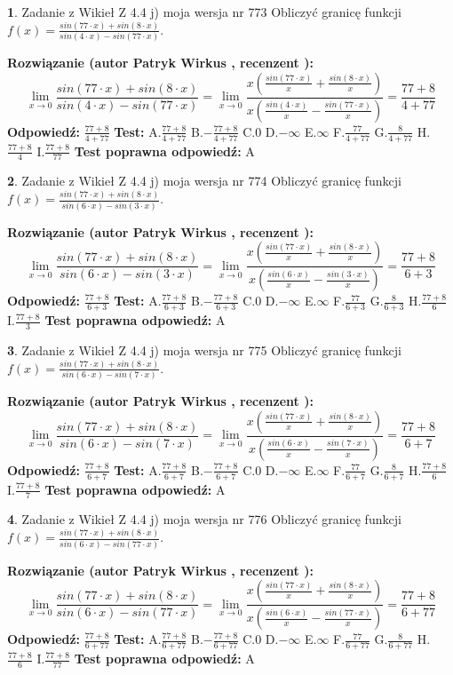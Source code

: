 \documentclass[12pt, a4paper]{article}
\theoremstyle{definition} %
\newtheorem{zad}{}
\newcommand{\zadStart}[1]{\begin{zad}#1\newline}
\newcommand{\zadStop}{\end{zad}}
\newcommand{\rozwStart}[2]{\noindent \textbf{Rozwiązanie (autor #1 , recenzent #2): }\newline}
\newcommand{\rozwStop}{\newline}
\newcommand{\odpStart}{\noindent \textbf{Odpowiedź:}\newline}
\newcommand{\odpStop}{\newline}
\newcommand{\testStart}{\noindent \textbf{Test:}\newline}
\newcommand{\testStop}{\newline}
\newcommand{\kluczStart}{\noindent \textbf{Test poprawna odpowiedź:}\newline}
\newcommand{\kluczStop}{\newline}
\begin{document}
\zadStart{Zadanie z Wikieł Z 4.4 j) moja wersja nr 773}
Obliczyć granicę funkcji $f(x)=\frac{sin(77\cdot x) +sin(8\cdot x)}{sin(4\cdot x) -sin(77\cdot x)}$.
\zadStop
\rozwStart{Patryk Wirkus}{}
$$\lim\limits_{x\to 0}\frac{sin(77\cdot x) +sin(8\cdot x)}{sin(4\cdot x) -sin(77\cdot x)}=\lim\limits_{x\to 0}\frac{x(\frac{sin(77\cdot x)}{x}+\frac{sin(8\cdot x)}{x})}{x(\frac{sin(4\cdot x)}{x}-\frac{sin(77\cdot x)}{x})}=\frac{77+8}{4+77}$$
\rozwStop
\odpStart
$\frac{77+8}{4+77}$
\odpStop
\testStart
A.$\frac{77+8}{4+77}$
B.$-\frac{77+8}{4+77}$
C.$0$
D.$-\infty$
E.$\infty$
F.$\frac{77}{4+77}$
G.$\frac{8}{4+77}$
H.$\frac{77+8}{4}$
I.$\frac{77+8}{77}$
\testStop
\kluczStart
A
\kluczStop



\zadStart{Zadanie z Wikieł Z 4.4 j) moja wersja nr 774}
Obliczyć granicę funkcji $f(x)=\frac{sin(77\cdot x) +sin(8\cdot x)}{sin(6\cdot x) -sin(3\cdot x)}$.
\zadStop
\rozwStart{Patryk Wirkus}{}
$$\lim\limits_{x\to 0}\frac{sin(77\cdot x) +sin(8\cdot x)}{sin(6\cdot x) -sin(3\cdot x)}=\lim\limits_{x\to 0}\frac{x(\frac{sin(77\cdot x)}{x}+\frac{sin(8\cdot x)}{x})}{x(\frac{sin(6\cdot x)}{x}-\frac{sin(3\cdot x)}{x})}=\frac{77+8}{6+3}$$
\rozwStop
\odpStart
$\frac{77+8}{6+3}$
\odpStop
\testStart
A.$\frac{77+8}{6+3}$
B.$-\frac{77+8}{6+3}$
C.$0$
D.$-\infty$
E.$\infty$
F.$\frac{77}{6+3}$
G.$\frac{8}{6+3}$
H.$\frac{77+8}{6}$
I.$\frac{77+8}{3}$
\testStop
\kluczStart
A
\kluczStop



\zadStart{Zadanie z Wikieł Z 4.4 j) moja wersja nr 775}
Obliczyć granicę funkcji $f(x)=\frac{sin(77\cdot x) +sin(8\cdot x)}{sin(6\cdot x) -sin(7\cdot x)}$.
\zadStop
\rozwStart{Patryk Wirkus}{}
$$\lim\limits_{x\to 0}\frac{sin(77\cdot x) +sin(8\cdot x)}{sin(6\cdot x) -sin(7\cdot x)}=\lim\limits_{x\to 0}\frac{x(\frac{sin(77\cdot x)}{x}+\frac{sin(8\cdot x)}{x})}{x(\frac{sin(6\cdot x)}{x}-\frac{sin(7\cdot x)}{x})}=\frac{77+8}{6+7}$$
\rozwStop
\odpStart
$\frac{77+8}{6+7}$
\odpStop
\testStart
A.$\frac{77+8}{6+7}$
B.$-\frac{77+8}{6+7}$
C.$0$
D.$-\infty$
E.$\infty$
F.$\frac{77}{6+7}$
G.$\frac{8}{6+7}$
H.$\frac{77+8}{6}$
I.$\frac{77+8}{7}$
\testStop
\kluczStart
A
\kluczStop



\zadStart{Zadanie z Wikieł Z 4.4 j) moja wersja nr 776}
Obliczyć granicę funkcji $f(x)=\frac{sin(77\cdot x) +sin(8\cdot x)}{sin(6\cdot x) -sin(77\cdot x)}$.
\zadStop
\rozwStart{Patryk Wirkus}{}
$$\lim\limits_{x\to 0}\frac{sin(77\cdot x) +sin(8\cdot x)}{sin(6\cdot x) -sin(77\cdot x)}=\lim\limits_{x\to 0}\frac{x(\frac{sin(77\cdot x)}{x}+\frac{sin(8\cdot x)}{x})}{x(\frac{sin(6\cdot x)}{x}-\frac{sin(77\cdot x)}{x})}=\frac{77+8}{6+77}$$
\rozwStop
\odpStart
$\frac{77+8}{6+77}$
\odpStop
\testStart
A.$\frac{77+8}{6+77}$
B.$-\frac{77+8}{6+77}$
C.$0$
D.$-\infty$
E.$\infty$
F.$\frac{77}{6+77}$
G.$\frac{8}{6+77}$
H.$\frac{77+8}{6}$
I.$\frac{77+8}{77}$
\testStop
\kluczStart
A
\kluczStop
\end{document}
